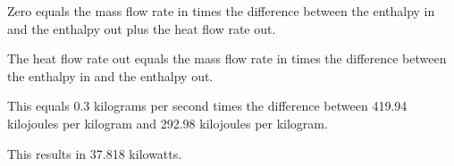 Zero equals the mass flow rate in times the difference between the enthalpy in and the enthalpy out plus the heat flow rate out.

The heat flow rate out equals the mass flow rate in times the difference between the enthalpy in and the enthalpy out.

This equals 0.3 kilograms per second times the difference between 419.94 kilojoules per kilogram and 292.98 kilojoules per kilogram.

This results in 37.818 kilowatts.